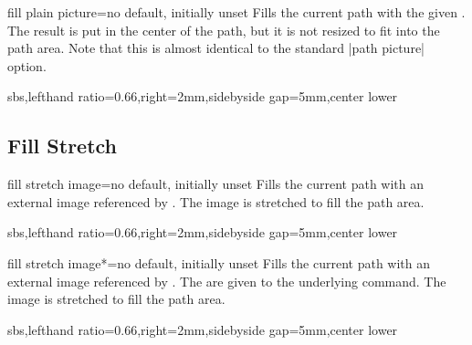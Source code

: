 \documentclass[a4paper,11pt]{article}
\begin{document}
\begin{myvoid}
\enlargethispage*{8mm}

\begin{docTikzKey}{fill plain picture}{=}{no default, initially unset}
  Fills the current path with the given .
  The result is put in the center of the path, but it is not resized to fit into
  the path area. Note that this is almost identical to the standard |path picture| option.
\begin{dispExample*}{sbs,lefthand ratio=0.66,right=2mm,sidebyside gap=5mm,center lower}
\end{dispExample*}
\end{docTikzKey}


\clearpage
\subsection{Fill Stretch}
\begin{docTikzKey}{fill stretch image}{=}{no default, initially unset}
  Fills the current path with an external image referenced by .
  The image is stretched to fill the path area.
\begin{dispExample*}{sbs,lefthand ratio=0.66,right=2mm,sidebyside gap=5mm,center lower}
\end{dispExample*}
\end{docTikzKey}


\begin{docTikzKey}{fill stretch image*}{=}{no default, initially unset}
  Fills the current path with an external image referenced by .
  The  are given to the underlying  command.
  The image is stretched to fill the path area.
\begin{dispExample*}{sbs,lefthand ratio=0.66,right=2mm,sidebyside gap=5mm,center lower}
\end{dispExample*}
\end{docTikzKey}



\end{myvoid}
\end{document}
